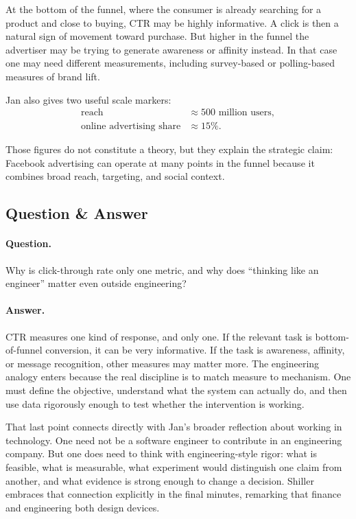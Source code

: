 At the bottom of the funnel, where the consumer is already searching for a product and close to buying, CTR may be highly informative. A click is then a natural sign of movement toward purchase. But higher in the funnel the advertiser may be trying to generate awareness or affinity instead. In that case one may need different measurements, including survey-based or polling-based measures of brand lift.

Jan also gives two useful scale markers:
\begin{align}
\text{reach} &\approx 500\text{ million users}, \\
\text{online advertising share} &\approx 15\%.
\end{align}

Those figures do not constitute a theory, but they explain the strategic claim: Facebook advertising can operate at many points in the funnel because it combines broad reach, targeting, and social context.

\subsection{Question \& Answer}

\paragraph{Question.} Why is click-through rate only one metric, and why does ``thinking like an engineer'' matter even outside engineering?

\paragraph{Answer.} CTR measures one kind of response, and only one. If the relevant task is bottom-of-funnel conversion, it can be very informative. If the task is awareness, affinity, or message recognition, other measures may matter more. The engineering analogy enters because the real discipline is to match measure to mechanism. One must define the objective, understand what the system can actually do, and then use data rigorously enough to test whether the intervention is working.

That last point connects directly with Jan's broader reflection about working in technology. One need not be a software engineer to contribute in an engineering company. But one does need to think with engineering-style rigor: what is feasible, what is measurable, what experiment would distinguish one claim from another, and what evidence is strong enough to change a decision. Shiller embraces that connection explicitly in the final minutes, remarking that finance and engineering both design devices.


